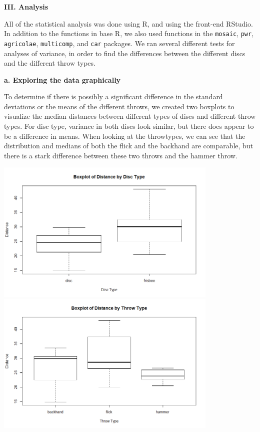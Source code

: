 \documentclass[letter,12pt]{article}
\begin{document}
	\begin{center}
		\textbf{III. Analysis}
	\end{center}
	\justify
	All of the statistical analysis was done using R, and using the front-end RStudio. In addition to the functions in base R, we also used functions in the \verb|mosaic|, \verb|pwr|, \verb|agricolae|, \verb|multicomp|, and \verb|car| packages. We ran several different tests for analyses of variance, in order to find the differences between the different discs and the different throw types.\par
	
	\begin{center}
		\textbf{a. Exploring the data graphically}
	\end{center}
	\justify
	To determine if there is possibly a significant difference in the standard deviations or the means of the different throws, we created two boxplots to visualize the median distances between different types of discs and different throw types. For disc type, variance in both discs look similar, but there does appear to be a difference in means. When looking at the throwtypes, we can see that the distribution and medians of both the flick and the backhand are comparable, but there is a stark difference between these two throws and the hammer throw.\par
  \begin{center}
    \includegraphics[width=0.8\textwidth]{boxplotdistdisc.png}
    \includegraphics[width=0.8\textwidth]{boxplotdiststhrow.png}
  \end{center}
\end{document}
